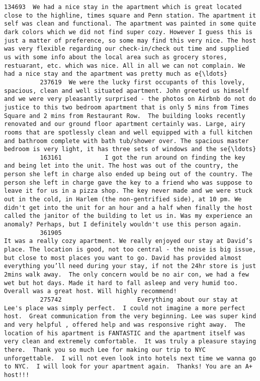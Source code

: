 \documentclass[11pt]{article}
\begin{document}
\begin{Verbatim}[commandchars=\\\{\}]
          134693  We had a nice stay in the apartment which is great located close to the highline, times square and Penn station. The apartment it self was clean and functional. The apartment was painted in some quite dark colors which we did not find super cozy. However I guess this is just a matter of preference, so some may find this very nice. The host was very flexible regarding our check-in/check out time and supplied us with some info about the local area such as grocery stores, restuarant, etc. which was nice. All in all we can not complain. We had a nice stay and the apartment was pretty much as e{\ldots}   
          237619  We were the lucky first occupants of this lovely, spacious, clean and well situated apartment. John greeted us himself and we were very pleasantly surprised - the photos on Airbnb do not do justice to this two bedroom apartment that is only 5 mins from Times Square and 2 mins from Restaurant Row.  The building looks recently renovated and our ground floor apartment certainly was. Large, airy rooms that are spotlessly clean and well equipped with a full kitchen and bathroom complete with bath tub/shower over. The spacious master bedroom is very light, it has three sets of windows and the se{\ldots}   
          163161            I got the run around on finding the key and being let into the unit. The host was out of the country, the person she left in charge also ended up being out of the country. The person she left in charge gave the key to a friend who was suppose to leave it for us in a pizza shop. The key never made and we were stuck out in the cold, in Harlem (the non-gentrified side), at 10 pm. We didn't get into the unit for an hour and a half when finally the host called the janitor of the building to let us in. Was my experience an anomaly? Perhaps, but I definitely wouldn't use this person again.   
          361905                                                                                                                                          It was a really cozy apartment. We really enjoyed our stay at David’s place. The location is good, not too central - the noise is big issue, but close to most places you want to go. David has provided almost everything you’ll need during your stay, if not the 24hr store is just 2mins walk away.  The only concern would be no air con, we had a few wet but hot days. Made it hard to fall asleep and very humid too.  Overall was a great host. Will highly recommend!   
          275742                     Everything about our stay at Lee's place was simply perfect.  I could not imagine a more perfect host.  Great communication from the very beginning. Lee was super kind and very helpful , offered help and was responsive right away.  The location of his apartment is FANTASTIC and the apartment itself was very clean and extremely comfortable.  It was truly a pleasure staying there.  Thank you so much Lee for making our trip to NYC unforgettable.  I will not even look into hotels next time we wanna go to NYC.  I will look for your apartment again.  Thanks! You are an A+ host!!!   

\end{Verbatim}
\end{document}
